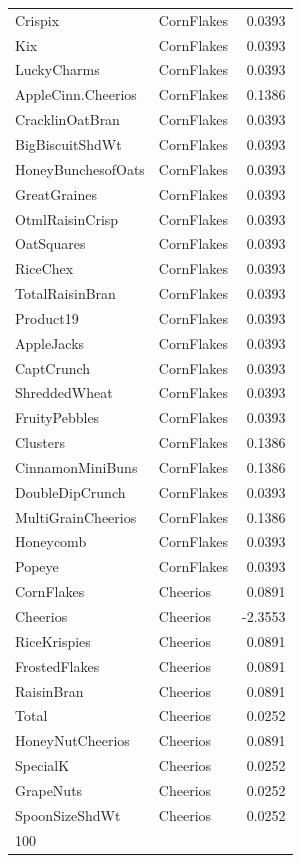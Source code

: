 \begin{longtable}{llr}
Crispix & CornFlakes & 0.0393 \\
Kix & CornFlakes & 0.0393 \\
LuckyCharms & CornFlakes & 0.0393 \\
AppleCinn.Cheerios & CornFlakes & 0.1386 \\
CracklinOatBran & CornFlakes & 0.0393 \\
BigBiscuitShdWt & CornFlakes & 0.0393 \\
HoneyBunchesofOats & CornFlakes & 0.0393 \\
GreatGraines & CornFlakes & 0.0393 \\
OtmlRaisinCrisp & CornFlakes & 0.0393 \\
OatSquares & CornFlakes & 0.0393 \\
RiceChex & CornFlakes & 0.0393 \\
TotalRaisinBran & CornFlakes & 0.0393 \\
Product19 & CornFlakes & 0.0393 \\
AppleJacks & CornFlakes & 0.0393 \\
CaptCrunch & CornFlakes & 0.0393 \\
ShreddedWheat & CornFlakes & 0.0393 \\
FruityPebbles & CornFlakes & 0.0393 \\
Clusters & CornFlakes & 0.1386 \\
CinnamonMiniBuns & CornFlakes & 0.1386 \\
DoubleDipCrunch & CornFlakes & 0.0393 \\
MultiGrainCheerios & CornFlakes & 0.1386 \\
Honeycomb & CornFlakes & 0.0393 \\
Popeye & CornFlakes & 0.0393 \\
CornFlakes & Cheerios & 0.0891 \\
Cheerios & Cheerios & -2.3553 \\
RiceKrispies & Cheerios & 0.0891 \\
FrostedFlakes & Cheerios & 0.0891 \\
RaisinBran & Cheerios & 0.0891 \\
Total & Cheerios & 0.0252 \\
HoneyNutCheerios & Cheerios & 0.0891 \\
SpecialK & Cheerios & 0.0252 \\
GrapeNuts & Cheerios & 0.0252 \\
SpoonSizeShdWt & Cheerios & 0.0252 \\
100%

\end{longtable}
